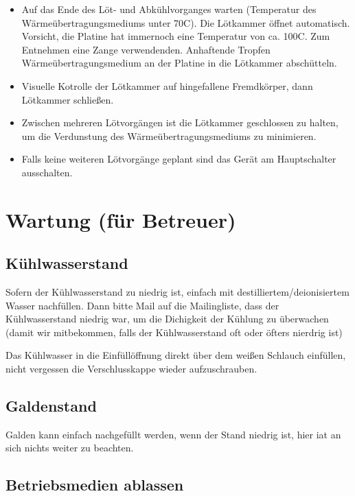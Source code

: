 \documentclass{\basedir/fablab-document}
\begin{document}
\begin{itemize}
	\item Auf das Ende des L{\"o}t- und Abk{\"u}hlvorganges warten (Temperatur des W{\"a}rme{\"u}bertragungsmediums unter 70\textdegree C). Die L{\"o}tkammer {\"o}ffnet automatisch. Vorsicht, die Platine hat immernoch eine Temperatur von ca. 100\textdegree C. Zum Entnehmen eine Zange verwendenden. Anhaftende Tropfen W{\"a}rme{\"u}bertragungsmedium an der Platine in die L{\"o}tkammer absch{\"u}tteln.
	\item Visuelle Kotrolle der L{\"o}tkammer auf hingefallene Fremdk{\"o}rper, dann L{\"o}tkammer schlie{\ss}en. 
	\item Zwischen mehreren L{\"o}tvorg{\"a}ngen ist die L{\"o}tkammer geschlossen zu halten, um die Verdunstung des W{\"a}rme{\"u}bertragungsmediums zu minimieren.
	\item Falls keine weiteren L{\"o}tvorg{\"a}nge geplant sind das Ger{\"a}t am Hauptschalter ausschalten. 
	
	\end{itemize}	
	
	\section{Wartung (f{\"u}r Betreuer)}
	
	\subsection{K{\"u}hlwasserstand}
	
	Sofern der K{\"u}hlwasserstand zu niedrig ist, einfach mit destilliertem/deionisiertem Wasser nachf{\"u}llen. Dann bitte Mail auf die Mailingliste, dass der K{\"u}hlwasserstand niedrig war, um die Dichigkeit der K{\"u}hlung zu {\"u}berwachen (damit wir mitbekommen, falls der K{\"u}hlwasserstand oft oder {\"o}fters nierdrig ist)
	
	 Das K{\"u}hlwasser in die Einf{\"u}ll{\"o}ffnung direkt {\"u}ber dem wei{\ss}en Schlauch einf{\"u}llen, nicht vergessen die Verschlusskappe wieder aufzuschrauben.
	
	\subsection{Galdenstand}	
	
	Galden kann einfach nachgef{\"u}llt werden, wenn der Stand niedrig ist, hier iat an sich nichts weiter zu beachten. 
	
	\subsection{Betriebsmedien ablassen}
	
\end{document}
